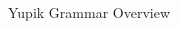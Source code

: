 \documentclass[usenames,dvipsnames]{beamer}
\begin{document}
\begin{frame}[fragile]

\vspace{28pt}

\begin{columns}[t]

\begin{column}{0.29\textwidth}
\begin{block}{Yupik Grammar Overview}


\end{block}
\end{column}
\end{columns}
\end{frame}
\end{document}
